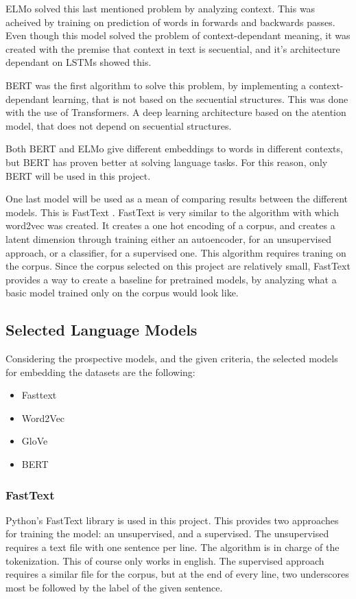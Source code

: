 ELMo solved this last mentioned problem by analyzing context\cite{TODO}. This was acheived by training on prediction of words in forwards and backwards passes. Even though this model solved the problem of context-dependant meaning, it was created with the premise that context in text is secuential, and it's architecture dependant on LSTMs showed this.

BERT was the first algorithm to solve this problem, by implementing a context-dependant learning, that is not based on the secuential structures. This was done with the use of Transformers. A deep learning architecture based on the atention model, that does not depend on secuential structures.

Both BERT and ELMo give different embeddings to words in different contexts, but BERT has proven better at solving language tasks. For this reason, only BERT will be used in this project.

One last model will be used as a mean of comparing results between the different models. This is FastText \cite{TODO}. FastText is very similar to the algorithm with which word2vec was created. It creates a one hot encoding of a corpus, and creates a latent dimension through training either an autoencoder, for an unsupervised approach, or a classifier, for a supervised one. This algorithm requires traning on the corpus. Since the corpus selected on this project are relatively small, FastText provides a way to create a baseline for pretrained models, by analyzing what a basic model trained only on the corpus would look like.

\subsection{Selected Language Models}\label{sub:Selected Language Models}

Considering the prospective models, and the given criteria, the selected models for embedding the datasets are the following:
\begin{itemize}
  \item Fasttext
  \item Word2Vec
  \item GloVe
  \item BERT
\end{itemize}

\subsubsection{FastText}\label{subs:FastText}
Python's FastText library\cite{TODO} is used in this project. This provides two approaches for training the model: an unsupervised, and a supervised. The unsupervised requires a text file with one sentence per line. The algorithm is in charge of the tokenization. This of course only works in english. The supervised approach requires a similar file for the corpus, but at the end of every line, two underscores most be followed by the label of the given sentence.

